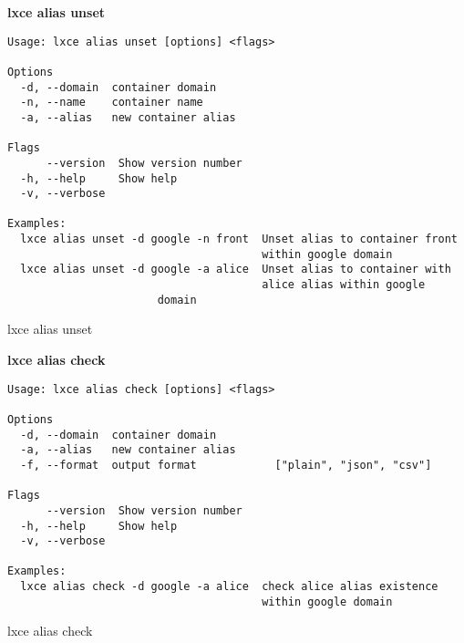 \newpage
\textbf{lxce alias unset}
\begin{listing}[H]
\begin{verbatim}
Usage: lxce alias unset [options] <flags>

Options
  -d, --domain  container domain                             
  -n, --name    container name                               
  -a, --alias   new container alias                          

Flags
      --version  Show version number                        
  -h, --help     Show help                                  
  -v, --verbose

Examples:
  lxce alias unset -d google -n front  Unset alias to container front 
                                       within google domain
  lxce alias unset -d google -a alice  Unset alias to container with 
                                       alice alias within google 
				       domain
\end{verbatim}
\caption{lxce alias unset}
\label{listings: lxce alias unset}
\end{listing}

\textbf{lxce alias check}
\begin{listing}[H]
\begin{verbatim}
Usage: lxce alias check [options] <flags>

Options
  -d, --domain  container domain                             
  -a, --alias   new container alias                          
  -f, --format  output format            ["plain", "json", "csv"]

Flags
      --version  Show version number                                   
  -h, --help     Show help                                             
  -v, --verbose

Examples:
  lxce alias check -d google -a alice  check alice alias existence 
                                       within google domain
\end{verbatim}
\caption{lxce alias check}
\label{listings: lxce alias check}
\end{listing}


